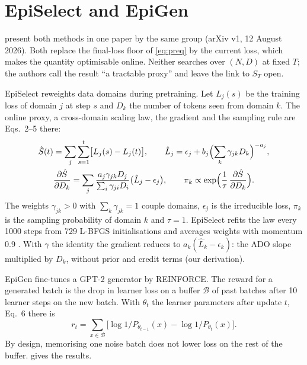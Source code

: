 \documentclass[11pt]{article}
\theoremstyle{tight}
\begin{document}
\section{EpiSelect and EpiGen}\label{sec:follow}
\citet{su2026epiplexity} present both methods in one paper by the same group (arXiv v1, 12 August
2026). Both replace the final-loss floor of \eqref{eq:preq} by the current loss, which makes the
quantity optimisable online. Neither searches over $(N,D)$ at fixed $T$; the authors call the result
``a tractable proxy'' and leave the link to $S_T$ open.

EpiSelect reweights data domains during pretraining. Let $L_j(s)$ be the training loss of domain
$j$ at step $s$ and $D_k$ the number of tokens seen from domain $k$. The online proxy, a cross-domain
scaling law, the gradient and the sampling rule are Eqs.~2--5 there:
\begin{gather}
\hat S(t)=\sum_{j}\sum_{s=1}^{t}\bigl[L_j(s)-L_j(t)\bigr],\qquad
\hat L_j=\epsilon_j+b_j\Bigl(\sum_k\gamma_{jk}D_k\Bigr)^{-a_j},\label{eq:episelect}\\
\frac{\partial\hat S}{\partial D_k}=\sum_j\frac{a_j\gamma_{jk}D_j}{\sum_i\gamma_{ji}D_i}\bigl(\hat
L_j-\epsilon_j\bigr),\qquad \pi_k\propto\exp\Bigl(\frac1\tau\,\frac{\partial\hat S}{\partial
D_k}\Bigr).\notag
\end{gather}
The weights $\gamma_{jk}>0$ with $\sum_k\gamma_{jk}=1$ couple domains, $\epsilon_j$ is the irreducible
loss, $\pi_k$ is the sampling probability of domain $k$ and $\tau=1$. EpiSelect refits the law every
1000 steps from 729 L-BFGS initialisations and averages weights with momentum 0.9
\citep{episelectcode}. With $\gamma$ the identity the gradient reduces to $a_k(\hat L_k-\epsilon_k)$:
the ADO slope \citep{jiang2025ado} multiplied by $D_k$, without prior and credit terms (our
derivation).

EpiGen fine-tunes a GPT-2 generator by REINFORCE. The reward for a generated batch is the drop in
learner loss on a buffer $\mathcal B$ of past batches after 10 learner steps on the new batch. With
$\theta_t$ the learner parameters after update $t$, Eq.~6 there is
\begin{equation}\label{eq:epigen}
r_t=\sum_{x\in\mathcal B}\bigl[\log1/P_{\theta_{t-1}}(x)-\log1/P_{\theta_t}(x)\bigr].
\end{equation}
By design, memorising one noise batch does not lower loss on the rest of the buffer. 
gives the results.
\end{document}
